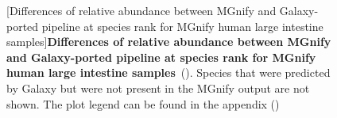\begin{figure}[H]
  \centering
  [Differences of relative abundance between MGnify and Galaxy-ported pipeline at species rank for MGnify human large intestine samples]{\textbf{Differences of relative abundance between MGnify and Galaxy-ported pipeline at species rank for MGnify human large intestine samples}~(). Species that were predicted by Galaxy but were not present in the MGnify output are not shown. The plot legend can be found in the appendix ()} \label{fig:mgnify_human_gut_rel_abundance_s_level}%
\end{figure}

